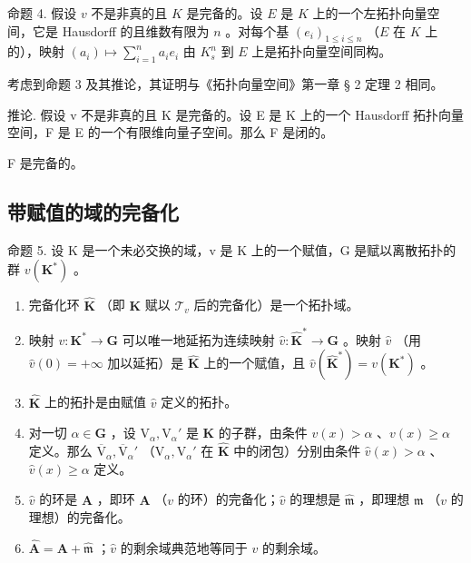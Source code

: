 命题 4. 假设 \(v\) 不是非真的且 \(K\) 是完备的。设 \(E\) 是 \(K\) 上的一个左拓扑向量空间，它是 Hausdorff 的且维数有限为 \(n\) 。对每个基 \((e_i)_{1 \leqslant i \leqslant n}\) （\(E\) 在 \(K\) 上的），映射 \((a_i) \mapsto \sum_{i=1}^{n} a_i e_i\) 由 \(K_s^n\) 到 \(E\) 上是拓扑向量空间同构。

考虑到命题 3 及其推论，其证明与《拓扑向量空间》第一章 § 2 定理 2 相同。

推论. 假设 v 不是非真的且 K 是完备的。设 E 是 K 上的一个 Hausdorff 拓扑向量空间，F 是 E 的一个有限维向量子空间。那么 F 是闭的。

F 是完备的。

\subsection{带赋值的域的完备化}

命题 5. 设 K 是一个未必交换的域，v 是 K 上的一个赋值，G 是赋以离散拓扑的群 \(v(\mathbf{K}^{*})\) 。

\begin{enumerate}
\def\labelenumi{(\alph{enumi})}
\item
  完备化环 \(\hat{\mathbf{K}}\) （即 \(\mathbf{K}\) 赋以 \(\mathcal{T}_v\) 后的完备化）是一个拓扑域。
\item
  映射 \(v: \mathbf{K}^* \to \mathbf{G}\) 可以唯一地延拓为连续映射 \(\hat{v}: \hat{\mathbf{K}}^* \to \mathbf{G}\) 。映射 \(\hat{v}\) （用 \(\hat{v}(0) = +\infty\) 加以延拓）是 \(\hat{\mathbf{K}}\) 上的一个赋值，且 \(\hat{v}(\hat{\mathbf{K}}^*) = v(\mathbf{K}^*)\) 。
\item
  \(\hat{\mathbf{K}}\) 上的拓扑是由赋值 \(\hat{v}\) 定义的拓扑。
\item
  对一切 \(\alpha \in \mathbf{G}\) ，设 \(\mathrm{V}_{\alpha}, \mathrm{V}_{\alpha}'\) 是 \(\mathbf{K}\) 的子群，由条件 \(v(x) > \alpha\) 、\(v(x) \geqslant \alpha\) 定义。那么 \(\overline{\mathrm{V}}_{\alpha}, \overline{\mathrm{V}}_{\alpha}'\) （\(\mathrm{V}_{\alpha}, \mathrm{V}_{\alpha}'\) 在 \(\hat{\mathbf{K}}\) 中的闭包）分别由条件 \(\hat{v}(x) > \alpha\) 、\(\hat{v}(x) \geqslant \alpha\) 定义。
\item
  \(\hat{v}\) 的环是 \(\hat{\mathbf{A}}\) ，即环 \(\mathbf{A}\) （\(v\) 的环）的完备化；\(\hat{v}\) 的理想是 \(\hat{\mathfrak{m}}\) ，即理想 \(\mathfrak{m}\) （\(v\) 的理想）的完备化。
\item
  \(\hat{\mathbf{A}} = \mathbf{A} + \hat{\mathfrak{m}}\) ；\(\hat{v}\) 的剩余域典范地等同于 \(v\) 的剩余域。
\end{enumerate}

